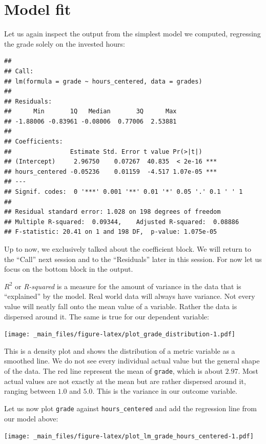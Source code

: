 \documentclass[
]{book}
\begin{document}
\hypertarget{model-fit}{%
\section{Model fit}\label{model-fit}}

Let us again inspect the output from the simplest model we computed, regressing
the grade solely on the invested hours:

\begin{verbatim}
## 
## Call:
## lm(formula = grade ~ hours_centered, data = grades)
## 
## Residuals:
##      Min       1Q   Median       3Q      Max 
## -1.88006 -0.83961 -0.08006  0.77006  2.53881 
## 
## Coefficients:
##                Estimate Std. Error t value Pr(>|t|)    
## (Intercept)     2.96750    0.07267  40.835  < 2e-16 ***
## hours_centered -0.05236    0.01159  -4.517 1.07e-05 ***
## ---
## Signif. codes:  0 '***' 0.001 '**' 0.01 '*' 0.05 '.' 0.1 ' ' 1
## 
## Residual standard error: 1.028 on 198 degrees of freedom
## Multiple R-squared:  0.09344,    Adjusted R-squared:  0.08886 
## F-statistic: 20.41 on 1 and 198 DF,  p-value: 1.075e-05
\end{verbatim}

Up to now, we exclusively talked about the coefficient block. We will return to
the ``Call'' next session and to the ``Residuals'' later in this session. For now
let us focus on the bottom block in the output.

\(R^2\) or \emph{R-squared} is a measure for the amount of variance in the data that is
``explained'' by the model. Real world data will always have variance. Not every
value will neatly fall onto the mean value of a variable. Rather the data is
dispersed around it. The same is true for our dependent variable:

\texttt{[image: \_main\_files/figure-latex/plot\_grade\_distribution-1.pdf]}

This is a density plot and shows the distribution of a metric variable as a
smoothed line. We do not see every individual actual value but the general shape
of the data. The red line represent the mean of \texttt{grade}, which is about \(2.97\).
Most actual values are not exactly at the mean but are rather dispersed around
it, ranging between \(1.0\) and \(5.0\). This is the variance in our outcome
variable.

Let us now plot \texttt{grade} against \texttt{hours\_centered} and add the regression line
from our model above:

\texttt{[image: \_main\_files/figure-latex/plot\_lm\_grade\_hours\_centered-1.pdf]}
\end{document}
